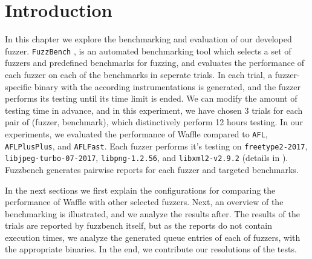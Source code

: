 \section{Introduction}
\label{sec:ch4-intro}


In this chapter we explore the benchmarking and evaluation of our developed fuzzer. \texttt{FuzzBench} \cite{metzman2020fuzzbench}, is an automated benchmarking tool which selects a set of fuzzers and predefined benchmarks for fuzzing, and evaluates the performance of each fuzzer on each of the benchmarks in seperate trials. In each trial, a fuzzer-specific binary with the according instrumentations is generated, and the fuzzer performs its testing until its time limit is ended. We can modify the amount of testing time in advance, and in this experiment, we have chosen 3 trials for each pair of (fuzzer, benchmark), which distinctively perform 12 hours testing. In our experiments, we evaluated the performance of Waffle compared to \texttt{AFL}, \texttt{AFLPlusPlus}, and \texttt{AFLFast}. Each fuzzer performs it's testing on \texttt{freetype2-2017}, \texttt{libjpeg-turbo-07-2017}, \texttt{libpng-1.2.56}, and \texttt{libxml2-v2.9.2} (details in \cite{fuzzbench_benchmarks}). Fuzzbench generates pairwise reports for each fuzzer and targeted benchmarks.

In the next sections we first explain the configurations for comparing the performance of Waffle with other selected fuzzers. Next, an overview of the benchmarking is illustrated, and we analyze the results after. The results of the trials are reported by fuzzbench itself, but as the reports do not contain execution times, we analyze the generated queue entries of each of fuzzers, with the appropriate binaries. In the end, we contribute our resolutions of the tests.